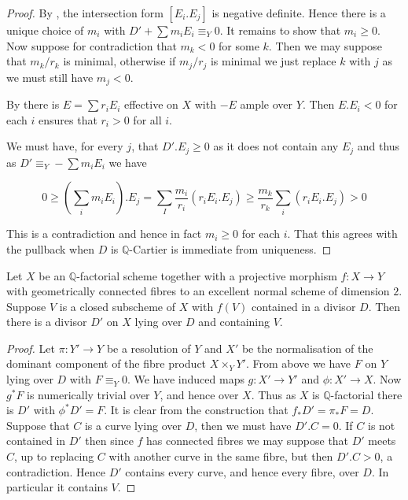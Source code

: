	\begin{proof}
		
		By \cite[Theorem 10.1]{kk-singbook}, the intersection form $[E_{i}.E_{j}]$ is negative definite. Hence there is a unique choice of $m_{i}$ with $D'+\sum m_{i}E_{i} \equiv_{Y} 0$. It remains to show that $m_{i} \geq 0$. Now suppose for contradiction that $m_{k} < 0$ for some $k$. Then we may suppose that $m_{k}/r_{k}$ is minimal, otherwise if $m_{j}/r_{j}$ is minimal we just replace $k$ with $j$ as we must still have $m_{j} < 0$.
		
		By \cite[Lemma 10.2]{kk-singbook} there is $E= \sum r_{i}E_{i}$ effective on $X$ with $-E$ ample over $Y$. Then $E.E_{i} < 0$ for each $i$ ensures that $r_{i} > 0$ for all $i$.
				
		We must have, for every $j$, that $D'.E_{j}\geq 0 $ as it does not contain any $E_{j}$ and thus as $D' \equiv_{Y} - \sum m_{i}E_{i}$ we have
		
		\[0\geq (\sum_{i} m_{i} E_{i}).E_{j} = \sum_{I} \frac{m_{i}}{r_{i}}(r_{i}E_{i}.E_{j}) \geq \frac{m_{k}}{r_{k}} \sum_{i} (r_{i}E_{i}.E_{j}) > 0\]
		
		This is a contradiction and hence in fact $m_{i} \geq 0$ for each $i$. That this agrees with the pullback when $D$ is $\mathbb{Q}$-Cartier is immediate from uniqueness.
		
	\end{proof}
	
	\begin{lemma}\label{num-pull}
		
		Let $X$ be an $\mathbb{Q}$-factorial scheme together with a projective morphism $f:X \to Y$  with geometrically connected fibres to an excellent normal scheme of dimension $2$. Suppose $V$ is a closed subscheme of $X$ with $f(V)$ contained in a divisor $D$. Then there is a divisor $D'$ on $X$ lying over $D$ and containing $V$.
		
		\end{lemma}
	
	\begin{proof}
		
		Let $\pi \colon Y' \to Y$ be a resolution of $Y$ and $X'$ be the normalisation of the dominant component of the fibre product $X\times_{Y} Y'$. From above we have $F$ on $Y$ lying over $D$ with $F \equiv_{Y} 0$. We have induced maps $g\colon X' \to Y'$ and $\phi\colon  X' \to X$. Now $g^{*}F$ is numerically trivial over $Y$, and hence over $X$. Thus as $X$ is $\mathbb{Q}$-factorial there is $D'$ with $\phi^{*}D'=F$. It is clear from the construction that $f_{*}D'=\pi_{*}F=D$. Suppose that $C$ is a curve lying over $D$, then we must have $D'.C =0$. If $C$ is not contained in $D'$ then since $f$ has connected fibres we may suppose that $D'$ meets $C$, up to replacing $C$ with another curve in the same fibre, but then $D'.C > 0$, a contradiction. Hence $D'$ contains every curve, and hence every fibre, over $D$. In particular it contains $V$.
		
		
	\end{proof}
	
